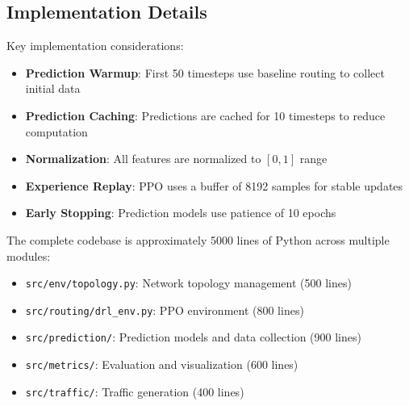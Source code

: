 \subsection{Implementation Details}

Key implementation considerations:

\begin{itemize}
\item \textbf{Prediction Warmup}: First 50 timesteps use baseline routing to collect initial data
\item \textbf{Prediction Caching}: Predictions are cached for 10 timesteps to reduce computation
\item \textbf{Normalization}: All features are normalized to $[0, 1]$ range
\item \textbf{Experience Replay}: PPO uses a buffer of 8192 samples for stable updates
\item \textbf{Early Stopping}: Prediction models use patience of 10 epochs
\end{itemize}

The complete codebase is approximately 5000 lines of Python across multiple modules:

\begin{itemize}
\item \texttt{src/env/topology.py}: Network topology management (500 lines)
\item \texttt{src/routing/drl\_env.py}: PPO environment (800 lines)
\item \texttt{src/prediction/}: Prediction models and data collection (900 lines)
\item \texttt{src/metrics/}: Evaluation and visualization (600 lines)
\item \texttt{src/traffic/}: Traffic generation (400 lines)
\end{itemize}

